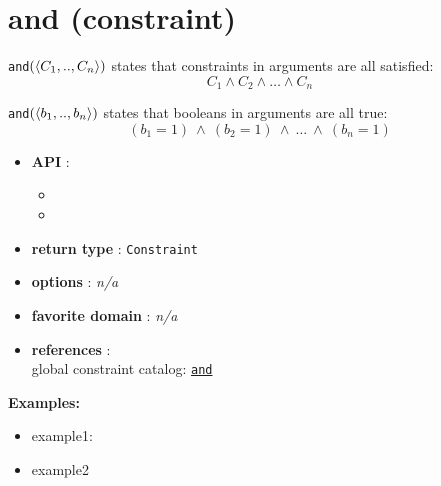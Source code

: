 \label{and}
\hypertarget{and}{}

\section{and (constraint)}\label{and:andconstraint}\hypertarget{and:andconstraint}{}
\begin{notedef}
  \texttt{and}$(\langle C_1,..,C_n\rangle)$ states that constraints in arguments are all satisfied:
$$ C_1 \land C_2 \land\ldots\land C_n$$

  \texttt{and}$(\langle b_1,..,b_n\rangle)$ states that booleans in arguments are all true:
$$ (b_1=1)\ \land\ (b_2=1)\ \land\ \ldots\ \land\ (b_n=1)$$
\end{notedef}

\begin{itemize}
\item \textbf{API} : 
\begin{itemize}
\item {}
\item {}
\end{itemize}
\item \textbf{return type} : \texttt{Constraint}
\item \textbf{options} : \emph{n/a}
\item \textbf{favorite domain} : \emph{n/a}
\item \textbf{references} :\\
  global constraint catalog: \href{http://www.emn.fr/x-info/sdemasse/gccat/Cand.html}{\tt and}
\end{itemize}

\textbf{Examples:}
\begin{itemize}
	\item example1:
\end{itemize}

\begin{itemize}
	\item example2
\end{itemize}



